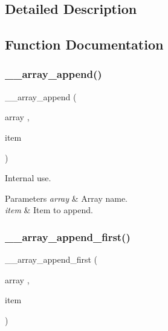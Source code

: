 \subsection{Detailed Description}


\subsection{Function Documentation}
\mbox{\label{group__array_gac1b58f87f18e51bccf0da88bb38a5254}} 
\subsubsection{\texorpdfstring{\+\_\+\+\_\+array\+\_\+append()}{\_\_array\_append()}}
{\footnotesize\ttfamily \+\_\+\+\_\+array\+\_\+append (\begin{DoxyParamCaption}\item[{array}]{,  }\item[{item}]{ }\end{DoxyParamCaption})}



Internal use. 


\begin{DoxyParams}{Parameters}
{\em array} & Array name. \\
\hline
{\em item} & Item to append. \\
\hline
\end{DoxyParams}
\mbox{\label{group__array_ga3b7dcece91caedf4e175177904b54b5d}} 
\subsubsection{\texorpdfstring{\+\_\+\+\_\+array\+\_\+append\+\_\+first()}{\_\_array\_append\_first()}}
{\footnotesize\ttfamily \+\_\+\+\_\+array\+\_\+append\+\_\+first (\begin{DoxyParamCaption}\item[{array}]{,  }\item[{item}]{ }\end{DoxyParamCaption})}



